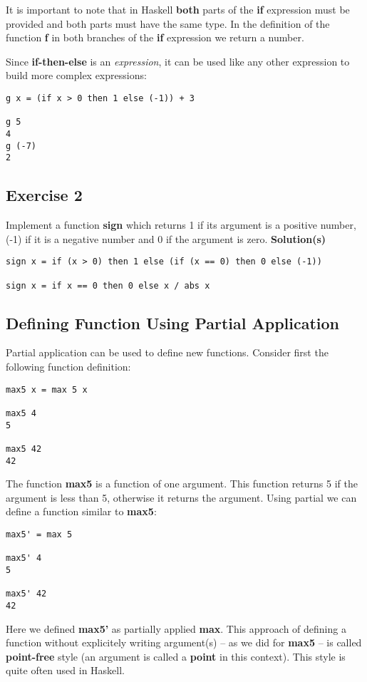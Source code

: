 \documentclass[11pt]{article}
\begin{document}
It is important to note that in Haskell \textbf{both} parts of the \textbf{if}
expression must be provided and both parts must have the same
type. In the definition of the function \textbf{f} in both branches of the
\textbf{if} expression we return a number.

Since \textbf{if-then-else} is an \emph{expression}, it can be used like any
other expression to build more complex expressions:
\begin{verbatim}
g x = (if x > 0 then 1 else (-1)) + 3

g 5
4
g (-7)
2
\end{verbatim}

\subsection{Exercise 2}
\label{sec:org9f671b0}
Implement a function \textbf{sign} which returns 1 if its argument is a
positive number, (-1) if it is a negative number and 0 if the
argument is zero.
\textbf{Solution(s)}
\begin{verbatim}
sign x = if (x > 0) then 1 else (if (x == 0) then 0 else (-1))

sign x = if x == 0 then 0 else x / abs x
\end{verbatim}

\subsection{Defining Function Using Partial Application}
\label{sec:org91f2f38}
Partial application can be used to define new functions. Consider
first the following function definition:
\begin{verbatim}
max5 x = max 5 x

max5 4
5

max5 42
42
\end{verbatim}
The function \textbf{max5} is a function of one argument. This function returns 5
if the argument is less than 5, otherwise it returns the argument.
Using partial we can define a function similar to \textbf{max5}:
\begin{verbatim}
max5' = max 5

max5' 4
5

max5' 42
42
\end{verbatim}
Here we defined \textbf{max5'} as partially applied \textbf{max}. This approach
of defining a function without explicitely writing argument(s) -- as
we did for \textbf{max5} -- is called \textbf{point-free} style (an argument is
called a \textbf{point} in this context). This style is quite often used in Haskell.
\end{document}
